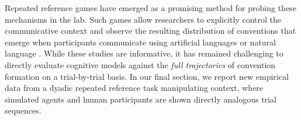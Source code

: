 Repeated reference games have emerged as a promising method for probing these mechanisms in the lab. 
Such games allow researchers to  explicitly control the communicative context and observe the resulting distribution of conventions that emerge when participants communicate using artificial languages \cite{WintersKirbySmith14_LanguagesAdapt, KirbyTamarizCornishSmith15_CompressionCommunication,winters2018contextual} or natural language \cite{hawkins2020characterizing}.
While these studies are informative, it has remained challenging to directly evaluate cognitive models against the \emph{full trajectories} of convention formation on a trial-by-trial basis.
In our final section, we report new empirical data from a dyadic repeated reference task manipulating context, where simulated agents and human participants are shown directly analogous trial sequences.

